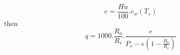 \[
  e = \frac{Hu}{100} . e_w(T_s)
\]
then
\[
  q = 1000 . \frac{R_a}{R_v} . \frac{e}{P_s - e (1-\frac{R_a}{R_v})}
\]

